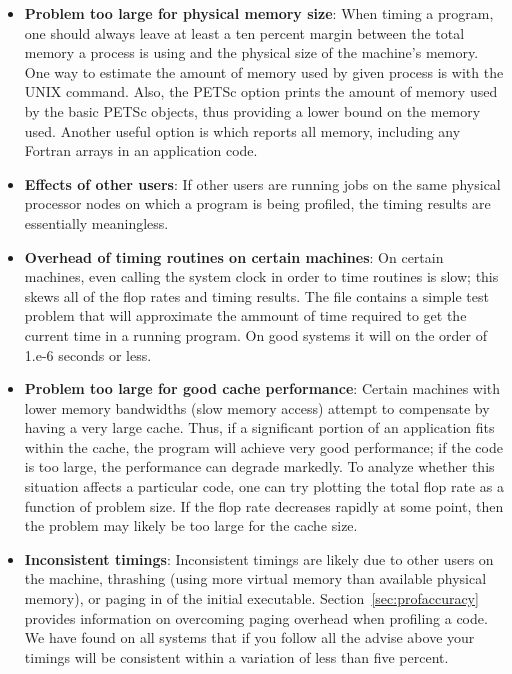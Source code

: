 \begin{itemize}
\item {\bf Problem too large for physical memory size}: When timing a program, one
      should always leave at least a ten percent margin between the total
      memory a process is using and the physical size of 
      the machine's memory. One way to estimate the amount of 
      memory used by given process is with the UNIX  command.
      Also, the PETSc option  prints the amount of 
      memory used by the basic PETSc objects, thus providing a lower
      bound on the memory used.  Another useful option is 
      which reports all memory, including any Fortran arrays in an
      application code.
\item {\bf Effects of other users}:  If other users are running
      jobs on the same physical processor nodes on which a program is being profiled,
      the timing results are essentially meaningless. 
\item {\bf Overhead of timing routines on certain machines}: On certain machines,
      even calling the system clock in order to time routines is 
      slow; this skews all of the flop rates and timing results. The file
       contains a
      simple test problem that will approximate the ammount of time
      required to get the current time in a running program. On good
      systems it will on the order of 1.e-6 seconds or less.
\item {\bf Problem too large for good cache performance}: Certain machines
      with lower memory bandwidths (slow memory access) attempt to 
      compensate by having a very large cache.  Thus, if a significant
      portion of an application fits within the cache, the program will achieve very 
      good performance; if the code is too large, the performance can degrade markedly.
      To analyze whether this situation affects a particular code, one can
      try plotting the total flop rate as a function of problem
      size.  If the flop rate decreases rapidly at some point, then the
      problem may likely be too large for the cache size. 
\item {\bf Inconsistent timings}:  Inconsistent timings are likely due to other
      users on the machine, thrashing (using more virtual memory than available
      physical memory), or paging in of the initial executable.  
      Section~\ref{sec:profaccuracy} provides information on overcoming paging
      overhead when profiling a code. We have found on all systems that if you 
      follow all the advise above your timings will be consistent within a variation
      of less than five percent.
\end{itemize}

